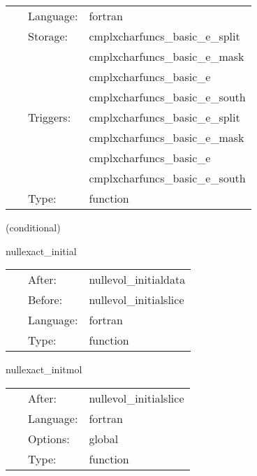  \begin{tabular*}{160mm}{cll} 
~ & Language:  & fortran \\ 
~ & Storage:  & cmplxcharfuncs\_basic\_e\_split \\ 
~& ~ &cmplxcharfuncs\_basic\_e\_mask\\ 
~& ~ &cmplxcharfuncs\_basic\_e\\ 
~& ~ &cmplxcharfuncs\_basic\_e\_south\\ 
~ & Triggers:  & cmplxcharfuncs\_basic\_e\_split \\ 
~& ~ &cmplxcharfuncs\_basic\_e\_mask\\ 
~& ~ &cmplxcharfuncs\_basic\_e\\ 
~& ~ &cmplxcharfuncs\_basic\_e\_south\\ 
~ & Type:  & function \\ 
\end{tabular*} 


\vspace{5mm}

   (conditional) 

\hspace{5mm} nullexact\_initial 

\hspace{5mm}{\it exact initial data for j } 


\hspace{5mm}

 \begin{tabular*}{160mm}{cll} 
~ & After:  & nullevol\_initialdata \\ 
~ & Before:  & nullevol\_initialslice \\ 
~ & Language:  & fortran \\ 
~ & Type:  & function \\ 
\end{tabular*} 


\vspace{5mm}


\hspace{5mm} nullexact\_initmol 

\hspace{5mm}{\it initial data } 


\hspace{5mm}

 \begin{tabular*}{160mm}{cll} 
~ & After:  & nullevol\_initialslice \\ 
~ & Language:  & fortran \\ 
~ & Options:  & global \\ 
~ & Type:  & function \\ 
\end{tabular*} 



